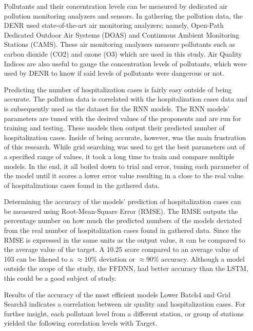 ﻿\documentclass[10pt,11pt,12pt,oneside]{book}
\begin{document}
Pollutants and their concentration levels can be measured by dedicated air pollution monitoring analyzers and sensors. In gathering the pollution data, the DENR used state-of-the-art air monitoring analyzers; namely, Open-Path Dedicated Outdoor Air Systems (DOAS) and Continuous Ambient Monitoring Stations (CAMS). These air monitoring analyzers measure pollutants such as carbon dioxide (CO2) and ozone (O3) which are used in this study. Air Quality Indices are also useful to gauge the concentration levels of pollutants, which were used by DENR to know if said levels of pollutants were dangerous or not.

Predicting the number of hospitalization cases is fairly easy outside of being accurate. The pollution data is correlated with the hospitalization cases data and is subsequently used as the dataset for the RNN models. The RNN models' parameters are tuned with the desired values of the proponents and are run for training and testing. These models then output their predicted number of hospitalization cases. Inside of being accurate, however, was the main frustration of this research. While grid searching was used to get the best parameters out of a specified range of values, it took a long time to train and compare multiple models. In the end, it all boiled down to trial and error, tuning each parameter of the model until it scores a lower error value resulting in a close to the real value of hospitalizations cases found in the gathered data. 

Determining the accuracy of the models' prediction of hospitalization cases can be measured using Root-Mean-Square Error (RMSE). The RMSE outputs the percentage number on how much the predicted numbers of the models deviated from the real number of hospitalization cases found in gathered data. Since the RMSE is expressed in the same units as the output value, it can be compared to the average value of the target. A 10.25 score compared to an average value of 103 can be likened to a $\approx$10\% deviation or $\approx$90\% accuracy. Although a model outside the scope of the study, the FFDNN, had better accuracy than the LSTM, this could be a good subject of study.

Results of the accuracy of the most efficient models Lower Batch4 and Grid Search3 indicates a correlation between air quality and hospitalization cases. For further insight, each pollutant level from a different station, or group of stations yielded the following correlation levels with Target.
\end{document}
